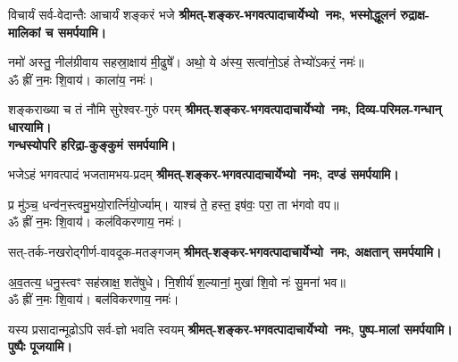\begin{center}
{विचार्यं सर्व-वेदान्तैः आचार्यं शङ्करं भजे}
\textbf{श्रीमत्-शङ्कर-भगवत्पादाचार्येभ्यो~नमः, भस्मोद्धूलनं रुद्राक्ष-मालिकां च समर्पयामि।}
\medskip

नमो॑ अस्तु॒ नील॑ग्रीवाय सहस्रा॒क्षाय॑ मी॒ढुषे᳚। अथो॒ ये अ॑स्य॒ सत्वा॑नो॒ऽहं तेभ्यो॑ऽकरं॒ नमः॑॥\\
ॐ ह्रीं न॒मः शि॒वाय॑। काला॑य॒ नमः॑।

{शङ्कराख्या च तं नौमि सुरेश्वर-गुरुं परम्}
\textbf{श्रीमत्-शङ्कर-भगवत्पादाचार्येभ्यो~नमः, दिव्य-परिमल-गन्धान् धारयामि।\\ गन्धस्योपरि हरिद्रा-कुङ्कुमं समर्पयामि।}
\medskip

{भजेऽहं भगवत्पादं भजतामभय-प्रदम्}
\textbf{श्रीमत्-शङ्कर-भगवत्पादाचार्येभ्यो~नमः, दण्डं समर्पयामि।}
\medskip

प्र मु॑ञ्च॒ धन्व॑न॒स्त्वमु॒भयो॒रार्त्नि॑यो॒र्ज्याम्। याश्च॑ ते॒ हस्त॒ इष॑वः॒ परा॒ ता भ॑गवो वप॥\\
ॐ ह्रीं न॒मः शि॒वाय॑। कल॑विकरणाय॒ नमः॑।

{सत्-तर्क-नखरोद्गीर्ण-वावदूक-मतङ्गजम्}
\textbf{श्रीमत्-शङ्कर-भगवत्पादाचार्येभ्यो~नमः, अक्षतान् समर्पयामि।}
\medskip

अ॒व॒तत्य॒ धनु॒स्त्वꣳ सह॑स्राक्ष॒ शते॑षुधे। नि॒शीर्य॑ श॒ल्यानां॒ मुखा॑ शि॒वो नः॑ सु॒मना॑ भव॥\\
ॐ ह्रीं न॒मः शि॒वाय॑। बल॑विकरणाय॒ नमः॑।

{यस्य प्रसादान्मूढोऽपि सर्व-ज्ञो भवति स्वयम्}
\textbf{श्रीमत्-शङ्कर-भगवत्पादाचार्येभ्यो~नमः, पुष्प-मालां समर्पयामि। पुष्पैः पूजयामि।}
\medskip
\endgroup

\end{center}

